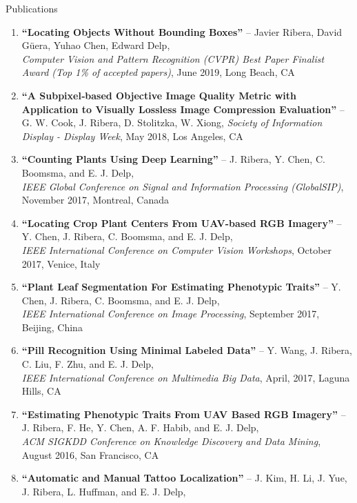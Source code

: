 \documentclass{resume} %
\begin{document}
\begin{rSection}{Publications}

\footnotesize
\begin{enumerate}
\setlength{\itemindent}{-.1in}
\item 
\textbf{``Locating Objects Without Bounding Boxes''} -- Javier Ribera, David Güera, Yuhao Chen, Edward Delp, \\
\emph{Computer Vision and Pattern Recognition (CVPR) Best Paper Finalist Award (Top 1\% of accepted papers)}, June 2019, Long Beach, CA
\item 
\textbf{``A Subpixel‐based Objective Image Quality Metric with Application to Visually Lossless Image Compression Evaluation''} -- 
    \\ G. W. Cook, J. Ribera, D. Stolitzka, W. Xiong, \emph{Society of Information Display - Display Week}, May 2018, Los Angeles, CA
\item 
\textbf{``Counting Plants Using Deep Learning''} -- J. Ribera, Y. Chen, C. Boomsma, and E. J. Delp, \\
		\emph{IEEE Global Conference on Signal and Information Processing (GlobalSIP)}, November 2017, Montreal, Canada
\item 
\textbf{``Locating Crop Plant Centers From UAV-based RGB Imagery''} -- Y. Chen, J. Ribera, C. Boomsma, and E. J. Delp, \\
		\emph{IEEE International Conference on Computer Vision Workshops}, October 2017, Venice, Italy
\item 
\textbf{``Plant Leaf Segmentation For Estimating Phenotypic Traits''} -- Y. Chen, J. Ribera, C. Boomsma, and E. J. Delp, \\
		\emph{IEEE International Conference on Image Processing}, September 2017, Beijing, China
\item 
\textbf{``Pill Recognition Using Minimal Labeled Data''} -- Y. Wang, J. Ribera, C. Liu, F. Zhu, and E. J. Delp, \\
		\emph{IEEE International Conference on Multimedia Big Data}, April, 2017, Laguna Hills, CA %
\item 
\textbf{``Estimating Phenotypic Traits From UAV Based RGB Imagery''} -- J. Ribera, F. He, Y. Chen, A. F. Habib, and E. J. Delp, \\
		\emph{ACM SIGKDD Conference on Knowledge Discovery and Data Mining}, August 2016, San Francisco, CA
\item 
\textbf{``Automatic and Manual Tattoo Localization''} -- J. Kim, H. Li, J. Yue, J. Ribera, L. Huffman, and E. J. Delp, \\

\end{enumerate}
\end{rSection}
\end{document}
